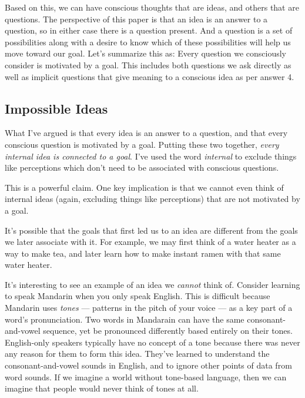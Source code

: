 \documentclass[11pt, oneside]{article}   	%
\newenvironment{answer}[1]
  {\renewcommand\theinnercustomthm{#1}\innercustomthm}
  {\endinnercustomthm}
\begin{document}
Based on this, we can have conscious thoughts that are ideas, and others that
are questions. The perspective of this paper is that an idea is an answer to a
question, so in either case there is a question present. And a question is a set
of possibilities along with a desire to know which of these possibilities will
help us move toward our goal.
Let's summarize this as:
\begin{answer}{5}
    Every question we consciously consider is motivated by a goal.
\end{answer}
This includes both questions we ask directly as well as
implicit questions that give meaning to a conscious idea as per
answer 4.

\subsection{Impossible Ideas}

What I've argued is that every idea is an answer to a question, and that every
conscious question is motivated by a goal. Putting these two together,
{\em every
internal idea is connected to a goal}. I've used the word {\em internal}
to exclude things like perceptions which don't need to be associated with
conscious questions.

This is a powerful claim. One key implication is that we cannot even think of
internal ideas (again, excluding things like perceptions)
that are not motivated by
a goal.

It's possible that the goals that first led us to an idea are
different from the goals we later associate with it. For example, we may first
think of a water heater as a way to make tea, and later learn how to make
instant ramen with that same water heater.

It's interesting to see an example of an idea we {\em cannot} think of.
Consider learning to speak Mandarin when you only speak English.
This is difficult because Mandarin uses {\em tones} --- patterns in the pitch of
your voice --- as a key part of a word's pronunciation.
Two words in Mandarain can have
the same consonant-and-vowel sequence, yet be
pronounced differently based entirely on their tones.
English-only speakers typically have no concept of a tone because there was
never any reason for them to form this idea.
They've learned to understand the consonant-and-vowel sounds in English, and to
ignore other points of data from word sounds. If we imagine a world without
tone-based language, then we can imagine that people would never think of
tones at all.
\end{document}
